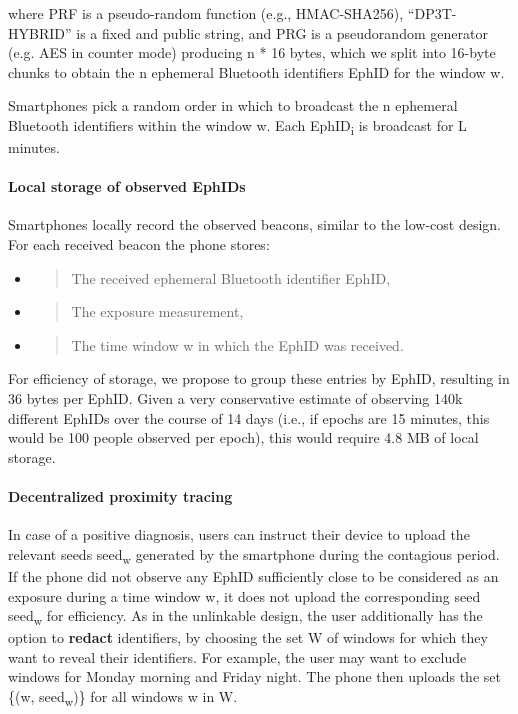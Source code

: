 \documentclass{article}
\begin{document}
where PRF is a pseudo-random function (e.g., HMAC-SHA256),
``DP3T-HYBRID'' is a fixed and public string, and PRG is a pseudorandom
generator (e.g. AES in counter mode) producing n * 16 bytes, which we
split into 16-byte chunks to obtain the n ephemeral Bluetooth
identifiers EphID for the window w.

Smartphones pick a random order in which to broadcast the n ephemeral
Bluetooth identifiers within the window w. Each EphID\textsubscript{i}
is broadcast for L minutes.

\hypertarget{local-storage-of-observed-ephids-1}{%
\paragraph{Local storage of observed
EphIDs}\label{local-storage-of-observed-ephids-1}}

Smartphones locally record the observed beacons, similar to the low-cost
design. For each received beacon the phone stores:

\begin{itemize}
\item
  \begin{quote}
  The received ephemeral Bluetooth identifier EphID,
  \end{quote}
\item
  \begin{quote}
  The exposure measurement,
  \end{quote}
\item
  \begin{quote}
  The time window w in which the EphID was received.
  \end{quote}
\end{itemize}

For efficiency of storage, we propose to group these entries by EphID,
resulting in 36 bytes per EphID. Given a very conservative estimate of
observing 140k different EphIDs over the course of 14 days (i.e., if
epochs are 15 minutes, this would be 100 people observed per epoch),
this would require 4.8 MB of local storage.

\hypertarget{decentralized-proximity-tracing-3}{%
\paragraph{Decentralized proximity
tracing}\label{decentralized-proximity-tracing-3}}

In case of a positive diagnosis, users can instruct their device to
upload the relevant seeds seed\textsubscript{w} generated by the
smartphone during the contagious period. If the phone did not observe
any EphID sufficiently close to be considered as an exposure during a
time window w, it does not upload the corresponding seed
seed\textsubscript{w} for efficiency. As in the unlinkable design, the
user additionally has the option to \textbf{redact} identifiers, by
choosing the set W of windows for which they want to reveal their
identifiers. For example, the user may want to exclude windows for
Monday morning and Friday night. The phone then uploads the set \{(w,
seed\textsubscript{w})\} for all windows w in W.
\end{document}
